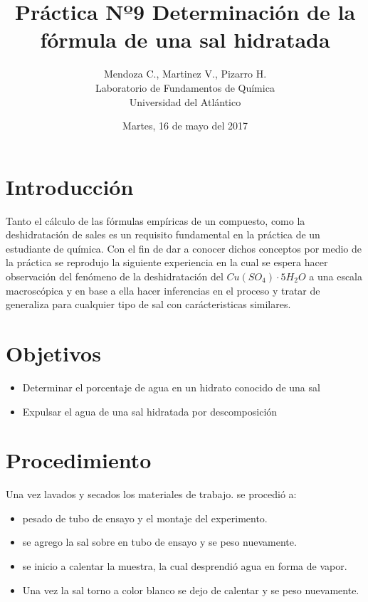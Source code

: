 \documentclass{article}
\title{Práctica Nº9 Determinación de la fórmula de una sal hidratada}
\author{Mendoza C., Martinez V., Pizarro H. \\Laboratorio de Fundamentos de Química \\Universidad del Atlántico}
\date{Martes, 16 de mayo del 2017}
\begin{document}
\maketitle 


\section{Introducción}

Tanto el cálculo de las fórmulas empíricas de un  compuesto, como la deshidratación de sales es un requisito fundamental en la práctica de un estudiante de química. Con el fin de dar a conocer dichos conceptos por medio de la práctica se reprodujo la siguiente experiencia en la cual se espera hacer observación del fenómeno de la deshidratación del $Cu(SO_{4})\cdot 5H_{2}O$  a una escala macroscópica y en base a ella hacer inferencias en el proceso y tratar de generaliza para cualquier tipo de sal con carácteristicas similares.

\section{Objetivos}

\begin{itemize}
\item {Determinar el porcentaje de agua en un hidrato conocido de una sal}
\item{Expulsar el agua de una sal hidratada por descomposición}
\end{itemize}

\section{Procedimiento}

Una vez lavados y secados los materiales de trabajo. se procedió a: 

\begin{itemize}
\item pesado de tubo de ensayo y el montaje del experimento.
\item se agrego la sal sobre en tubo de ensayo y se peso nuevamente. 
\item se inicio a calentar la muestra, la cual desprendió agua en forma de vapor.
\item Una vez la sal torno a color blanco se dejo de calentar y se peso nuevamente.
\end{itemize}
\end{document}
